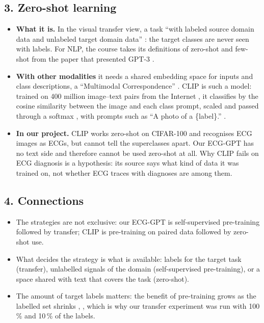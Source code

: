 \subsection*{3. Zero-shot learning}
\begin{itemize}[leftmargin=1.2em,itemsep=1pt]
  \item \textbf{What it is.} In the visual transfer view, a task ``with labeled source domain data and
        unlabeled target domain data'' \cite[p.~4]{monka2022survey}: the target classes are never seen
        with labels. For NLP, the course takes its definitions of zero-shot and few-shot from the paper
        that presented GPT-3 \cite{course_summary_0910}.
  \item \textbf{With other modalities} it needs a shared embedding space for inputs and class
        descriptions, a ``Multimodal Correspondence'' \cite{course_summary_0910}. CLIP is such a model:
        trained on 400 million image--text pairs from the Internet \cite[p.~3]{radford2021learning}, it
        classifies by the cosine similarity between the image and each class prompt, scaled and passed
        through a softmax \cite[p.~6]{radford2021learning}, with prompts such as ``A photo of a
        \{label\}.'' \cite[p.~7]{radford2021learning}.
  \item \textbf{In our project.} CLIP works zero-shot on CIFAR-100 and recognises ECG images as ECGs,
        but cannot tell the superclasses apart. Our ECG-GPT has no text side and therefore cannot be used
        zero-shot at all. Why CLIP fails on ECG diagnosis is a hypothesis: its source says what kind of
        data it was trained on, not whether ECG traces with diagnoses are among them.
\end{itemize}

\subsection*{4. Connections}
\begin{itemize}[leftmargin=1.2em,itemsep=1pt]
  \item The strategies are not exclusive: our ECG-GPT is self-supervised pre-training followed by
        transfer; CLIP is pre-training on paired data followed by zero-shot use.
  \item What decides the strategy is what is available: labels for the target task (transfer),
        unlabelled signals of the domain (self-supervised pre-training), or a space shared with text that
        covers the task (zero-shot).
  \item The amount of target labels matters: the benefit of pre-training grows as the labelled set
        shrinks \cite[p.~1524]{strodthoff2021deep}, \cite[pp.~7--8]{mehari2022self}, which is why our
        transfer experiment was run with 100\,\% and 10\,\% of the labels.
\end{itemize}
